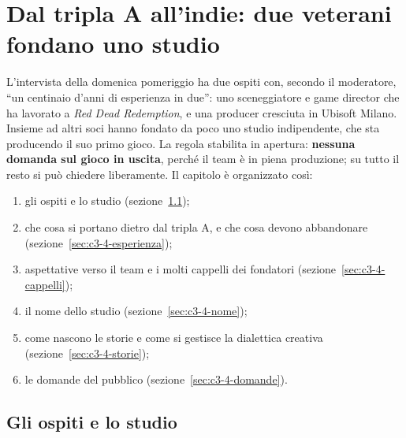 
\chapter[Dal tripla A all'indie: Day 4 Night]{Dal tripla A all'indie: due veterani
fondano uno studio}
\label{cap:c3-4-day-4-night}

L'intervista della domenica pomeriggio ha due ospiti con, secondo il moderatore,
``un centinaio d'anni di esperienza in due'': uno sceneggiatore e game director che
ha lavorato a \emph{Red Dead Redemption}, e una producer cresciuta in Ubisoft
Milano. Insieme ad altri soci hanno fondato da poco uno studio indipendente, che
sta producendo il suo primo gioco. La regola stabilita in apertura:
\textbf{nessuna domanda sul gioco in uscita}, perché il team è in piena
produzione; su tutto il resto si può chiedere liberamente. Il capitolo è
organizzato così:
\begin{enumerate}
  \item gli ospiti e lo studio (sezione~\ref{sec:c3-4-ospiti});
  \item che cosa si portano dietro dal tripla A, e che cosa devono abbandonare
        (sezione~\ref{sec:c3-4-esperienza});
  \item aspettative verso il team e i molti cappelli dei fondatori
        (sezione~\ref{sec:c3-4-cappelli});
  \item il nome dello studio (sezione~\ref{sec:c3-4-nome});
  \item come nascono le storie e come si gestisce la dialettica creativa
        (sezione~\ref{sec:c3-4-storie});
  \item le domande del pubblico (sezione~\ref{sec:c3-4-domande}).
\end{enumerate}

\section{Gli ospiti e lo studio}
\label{sec:c3-4-ospiti}

